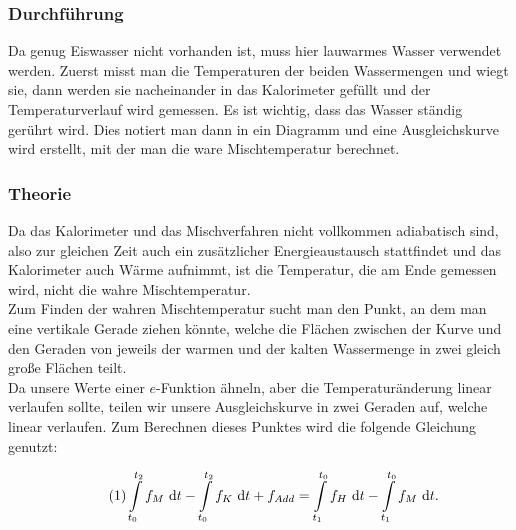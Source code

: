 \documentclass[11pt,a4paper]{article}
\begin{document}
\subsubsection{Durchf\"uhrung}

Da genug Eiswasser nicht vorhanden ist, muss hier lauwarmes Wasser verwendet werden. Zuerst misst man die Temperaturen der beiden Wassermengen und wiegt sie, dann werden sie nacheinander in das Kalorimeter gef\"ullt und der Temperaturverlauf wird gemessen. Es ist wichtig, dass das Wasser ständig gerührt wird. Dies notiert man dann in ein Diagramm und eine Ausgleichskurve wird erstellt, mit der man die ware Mischtemperatur berechnet.

\subsubsection{Theorie}

Da das Kalorimeter und das Mischverfahren nicht vollkommen adiabatisch sind, also zur gleichen Zeit auch ein zus\"atzlicher Energieaustausch stattfindet und das Kalorimeter auch W\"arme aufnimmt, ist die Temperatur, die am Ende gemessen wird, nicht die wahre Mischtemperatur.\\
Zum Finden der wahren Mischtemperatur sucht man den Punkt, an dem man eine vertikale Gerade ziehen k\"onnte, welche die Fl\"achen zwischen der Kurve und den Geraden von jeweils der warmen und der kalten Wassermenge in zwei gleich gro\ss e Fl\"achen teilt.\\
Da unsere Werte einer $e$-Funktion \"ahneln, aber die Temperatur\"anderung linear verlaufen sollte, teilen wir unsere Ausgleichskurve in zwei Geraden auf, welche linear verlaufen.
Zum Berechnen dieses Punktes wird die folgende Gleichung genutzt:

\begin{equation}\tag{1}
\int\displaylimits_{t_{0}}^{t_2} f_M\ \mathrm{d}t - \int\displaylimits_{t_{0}}^{t_2} f_K\ \mathrm{d}t + f_{Add}= \int\displaylimits_{t_1}^{t_{0}} f_H\ \mathrm{d}t - \int\displaylimits_{t_1}^{t_{0}} f_M\ \mathrm{d}t.\label{bigint1}
\end{equation}
\end{document}
